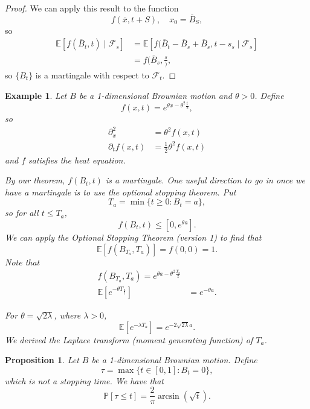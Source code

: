\documentclass{tufte-handout}
\newcommand*\E{\mathbb{E}}
\renewcommand*\P{\mathbb{P}}
\newtheorem{ex}[thm]{Example}
\newtheorem{prop}[thm]{Proposition}
\theoremstyle{definition}
\begin{document}
\begin{proof}
	We can apply this result to the function \[
		f(\overline{x}, t+ S) ,\quad x_0 = \overline{B}_S
	,\] so 
	\begin{align*}
		\E\left[f(\overline{B}_t, t) \mid \mathscr{F}_{s} \right] &= \E\left[f(\overline{B}_t - \overline{B}_s + \overline{B}_s, t-s _ s \mid \mathscr{F}_s\right]  \\
																  &= f(\overline{B}_s,\frac{s})
															  ,\end{align*}
															  so $\{B_t\}$ is a martingale with respect to $\mathscr{F}_t$.

\end{proof}

\begin{ex}
	Let $B$ be a 1-dimensional Brownian motion and $\theta > 0$. Define \[
		f(x,t) = e^{\theta x - \theta^2 \frac{t}{2}}
	,\] so 
	\begin{align*}
		\partial^2_x &= \theta^2 f(x,t) \\
		\partial_t f(x,t) &= \frac{1}{2} \theta^2 f(x,t)
	\end{align*} and $f$ satisfies the heat equation.

	By our theorem, $f(B_t, t)$ is a martingale. One useful direction to go in once we have a martingale is to use the optional stopping theorem. Put \[
		T_a = \min \{t \ge 0: B_t = a\}
	,\] so for all $t \le T_a$, \[
		f(B_t, t) \le \left[ 0,e^{\theta a} \right]
	.\] We can apply the Optional Stopping Theorem (version 1) to find that \[
		\E\left[f(B_{T_a}, T_a)\right] = f(0,0) = 1
	.\] Note that 
	\begin{align*}
		f(B_{T_a}, T_a) = e^{\theta a - \theta^2 \frac{T_a}{2}} \\
		\E\left[e^{-\theta T_\frac{a}{2}}\right] &= e^{-\theta a}
	.\end{align*}

	For $\theta = \sqrt{2 \lambda}$, where $\lambda >0$, \[
		\E\left[e^{-\lambda T_a}\right]= e^{-2\sqrt{2\lambda} a}
	.\] We derived the Laplace transform (moment generating function) of $T_a$.
\end{ex}


\begin{prop}
	Let $B$ be a 1-dimensional Brownian motion. Define \[
		\tau = \max \{t \in [0,1] : B_t = 0\}
,\] which is \emph{not} a stopping time. We have that \[
		\P\left[\tau \le t\right] = \frac{2}{\pi} \arcsin{\left( \sqrt{t}  \right)}
	.\] 
\end{prop}
\end{document}
